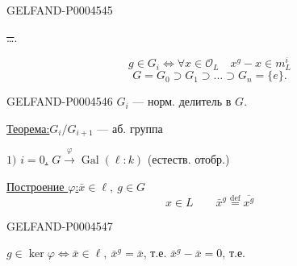\begin{GelfandAdjacentEvidence}{GELFAND-P000454}{5}


\quad \sout{\ldots}.

\[
g\in G_i\Longleftrightarrow \forall x\in \mathcal O_L\quad x^g-x\in m_L^i
\]
\[
G=G_0\supset G_1\supset\ldots\supset G_n=\{e\}.
\]
\end{GelfandAdjacentEvidence}
\begin{GelfandAdjacentEvidence}{GELFAND-P000454}{6}
$G_i$ — норм. делитель в $G$.

\underline{Теорема:}\quad $G_i/G_{i+1}$ — аб. группа

$1)$ \underline{$i=0$.}\qquad
$G\overset{\varphi}{\longrightarrow}\operatorname{Gal}(\ell:k)$
(естеств. отобр.)

\underline{Построение $\varphi$:}\quad $\bar x\in\ell,\ g\in G$
\[
x\in L\qquad \bar x^g\overset{\mathrm{def}}{=}\overline{x^g}
\]
\end{GelfandAdjacentEvidence}
\begin{GelfandAdjacentEvidence}{GELFAND-P000454}{7}


$g\in\ker\varphi\Longleftrightarrow \bar x\in\ell,\ \bar x^g=\bar x$,
т.е. $\bar x^g-\bar x=0$, т.е.
\end{GelfandAdjacentEvidence}



